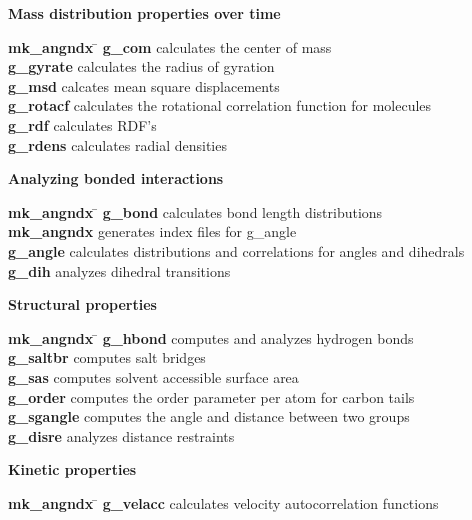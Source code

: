 \begin{description}
\item {\large\bf Mass distribution properties over time}
\begin{tabbing}
{\bf mk\_angndx} \= \kill
{\bf g\_com} \> calculates the center of mass \\
{\bf g\_gyrate} \> calculates the radius of gyration \\
{\bf g\_msd} \> calcates mean square displacements \\
{\bf g\_rotacf} \> calculates the rotational correlation function for molecules \\
{\bf g\_rdf} \> calculates RDF's \\
{\bf g\_rdens} \> calculates radial densities \\
\end{tabbing}

\item {\large\bf Analyzing bonded interactions}
\begin{tabbing}
{\bf mk\_angndx} \= \kill
{\bf g\_bond} \> calculates bond length distributions \\
{\bf mk\_angndx} \> generates index files for g\_angle \\
{\bf g\_angle} \> calculates distributions and correlations for angles and dihedrals \\
{\bf g\_dih} \> analyzes dihedral transitions \\
\end{tabbing}

\item {\large\bf Structural properties}
\begin{tabbing}
{\bf mk\_angndx} \= \kill
{\bf g\_hbond} \> computes and analyzes hydrogen bonds \\
{\bf g\_saltbr} \> computes salt bridges \\
{\bf g\_sas} \> computes solvent accessible surface area \\
{\bf g\_order} \> computes the order parameter per atom for carbon tails \\
{\bf g\_sgangle} \> computes the angle and distance between two groups \\
{\bf g\_disre} \> analyzes distance restraints \\
\end{tabbing}

\item {\large\bf Kinetic properties}
\begin{tabbing}
{\bf mk\_angndx} \= \kill
{\bf g\_velacc} \> calculates velocity autocorrelation functions \\
\end{tabbing}


\end{description}
